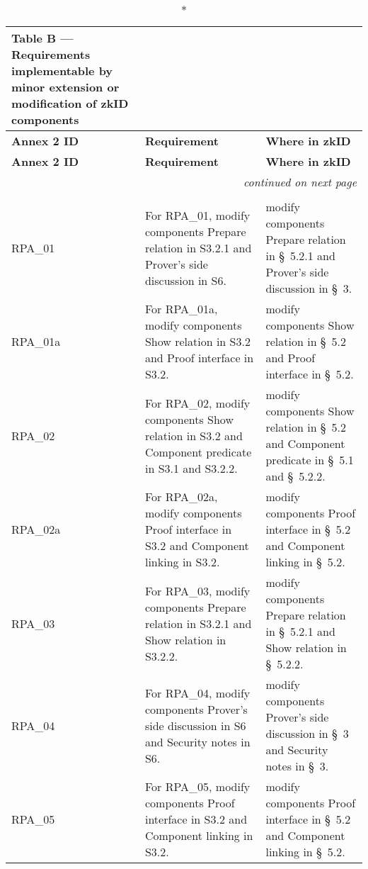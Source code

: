 \clearpage
\begin{landscape}
\small
\begin{longtable}{p{3cm} p{10cm} p{7cm}}
\caption*{Table B — Requirements implementable by minor extension or modification of zkID components}\\
\toprule
\textbf{Annex 2 ID} &
\textbf{Requirement} &
\textbf{Where in zkID} \\
\midrule
\endfirsthead
\toprule
\textbf{Annex 2 ID} &
\textbf{Requirement} &
\textbf{Where in zkID} \\
\midrule
\endhead
\midrule
\multicolumn{3}{r}{\emph{continued on next page}}\\
\bottomrule
\endfoot
\bottomrule
\endlastfoot

\multicolumn{3}{l}{\textbf{Topic 6 — Relying Party authentication and User approval}}\\

RPA\_01 &
For RPA\_01, modify components Prepare relation in S3.2.1 and Prover's side discussion in S6. &
modify components Prepare relation in \S~5.2.1 and Prover's side discussion in \S~3. \\

RPA\_01a &
For RPA\_01a, modify components Show relation in S3.2 and Proof interface in S3.2. &
modify components Show relation in \S~5.2 and Proof interface in \S~5.2. \\

RPA\_02 &
For RPA\_02, modify components Show relation in S3.2 and Component predicate in S3.1 and S3.2.2. &
modify components Show relation in \S~5.2 and Component predicate in \S~5.1 and \S~5.2.2. \\

RPA\_02a &
For RPA\_02a, modify components Proof interface in S3.2 and Component linking in S3.2. &
modify components Proof interface in \S~5.2 and Component linking in \S~5.2. \\

RPA\_03 &
For RPA\_03, modify components Prepare relation in S3.2.1 and Show relation in S3.2.2. &
modify components Prepare relation in \S~5.2.1 and Show relation in \S~5.2.2. \\

RPA\_04 &
For RPA\_04, modify components Prover's side discussion in S6 and Security notes in S6. &
modify components Prover's side discussion in \S~3 and Security notes in \S~3. \\

RPA\_05 &
For RPA\_05, modify components Proof interface in S3.2 and Component linking in S3.2. &
modify components Proof interface in \S~5.2 and Component linking in \S~5.2. \\


\end{longtable}
\end{landscape}
